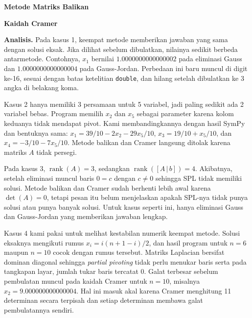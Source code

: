 \begin{kasus}
\textbf{Metode Matriks Balikan}

\textbf{Kaidah Cramer}
\end{kasus}

\textbf{Analisis.} Pada kasus 1, keempat metode memberikan jawaban yang sama dengan solusi eksak. Jika dilihat sebelum dibulatkan, nilainya sedikit berbeda antarmetode. Contohnya, $x_1$ bernilai $1.0000000000000002$ pada eliminasi Gauss dan $1.0000000000000004$ pada Gauss-Jordan. Perbedaan ini baru muncul di digit ke-16, sesuai dengan batas ketelitian \texttt{double}, dan hilang setelah dibulatkan ke 3 angka di belakang koma.

Kasus 2 hanya memiliki 3 persamaan untuk 5 variabel, jadi paling sedikit ada 2 variabel bebas. Program memilih $x_2$ dan $x_5$ sebagai parameter karena kolom keduanya tidak mendapat pivot. Kami membandingkannya dengan hasil SymPy dan bentuknya sama: $x_1 = 39/10 - 2x_2 - 29x_5/10$, $x_3 = 19/10 + x_5/10$, dan $x_4 = -3/10 - 7x_5/10$. Metode balikan dan Cramer langsung ditolak karena matriks $A$ tidak persegi.

Pada kasus 3, $\operatorname{rank}(A) = 3$, sedangkan $\operatorname{rank}([A\,|\,b]) = 4$. Akibatnya, setelah eliminasi muncul baris $0 = c$ dengan $c \neq 0$ sehingga SPL tidak memiliki solusi. Metode balikan dan Cramer sudah berhenti lebih awal karena $\det(A) = 0$, tetapi pesan itu belum menjelaskan apakah SPL-nya tidak punya solusi atau punya banyak solusi. Untuk kasus seperti ini, hanya eliminasi Gauss dan Gauss-Jordan yang memberikan jawaban lengkap.

Kasus 4 kami pakai untuk melihat kestabilan numerik keempat metode. Solusi eksaknya mengikuti rumus $x_i = i(n+1-i)/2$, dan hasil program untuk $n = 6$ maupun $n = 10$ cocok dengan rumus tersebut. Matriks Laplacian bersifat dominan diagonal sehingga \textit{partial pivoting} tidak perlu menukar baris serta pada tangkapan layar, jumlah tukar baris tercatat 0. Galat terbesar sebelum pembulatan muncul pada kaidah Cramer untuk $n = 10$, misalnya $x_2 = 9.000000000000004$. Hal ini masuk akal karena Cramer menghitung 11 determinan secara terpisah dan setiap determinan membawa galat pembulatannya sendiri.

